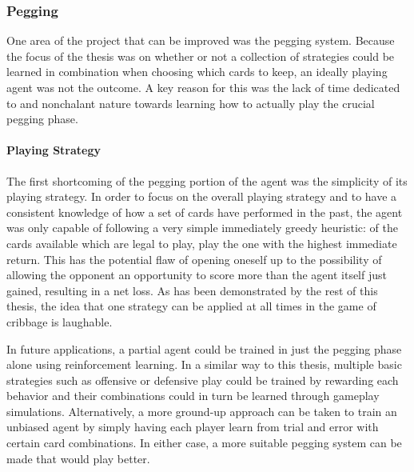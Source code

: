 
\subsubsection*{Pegging}
\label{sec:disc-future-pegging}



One area of the project that can be improved was the pegging system.
%
Because the focus of the thesis was on whether or not a collection of
strategies could be learned in combination when choosing which cards to keep,
an ideally playing agent was not the outcome.
%
A key reason for this was the lack of time dedicated to and nonchalant nature
towards learning how to actually play the crucial pegging phase.

\paragraph*{Playing Strategy}


The first shortcoming of the pegging portion of the agent was the simplicity
of its playing strategy.
%
In order to focus on the overall playing strategy and to have a consistent
knowledge of how a set of cards have performed in the past,
the agent was only capable of following a very simple immediately greedy 
heuristic:
of the cards available which are legal to play,
play the one with the highest immediate return.
%
This has the potential flaw of
opening oneself up to the possibility of allowing the opponent an opportunity
to score more than the agent itself just gained,
resulting in a net loss.
%
As has been demonstrated by the rest of this thesis,
the idea that one strategy can be applied at all times in the game of cribbage
is laughable.

In future applications,
a partial agent could be trained in just the pegging phase alone
using reinforcement learning.
%
In a similar way to this thesis,
multiple basic strategies such as offensive or defensive play
could be trained by rewarding each behavior and their combinations
could in turn be learned through gameplay simulations.
%
Alternatively,
a more ground-up approach can be taken to train an unbiased agent by simply
having each player learn from trial and error with certain card combinations.
%
%
In either case,
a more suitable pegging system can be made that would play better.

